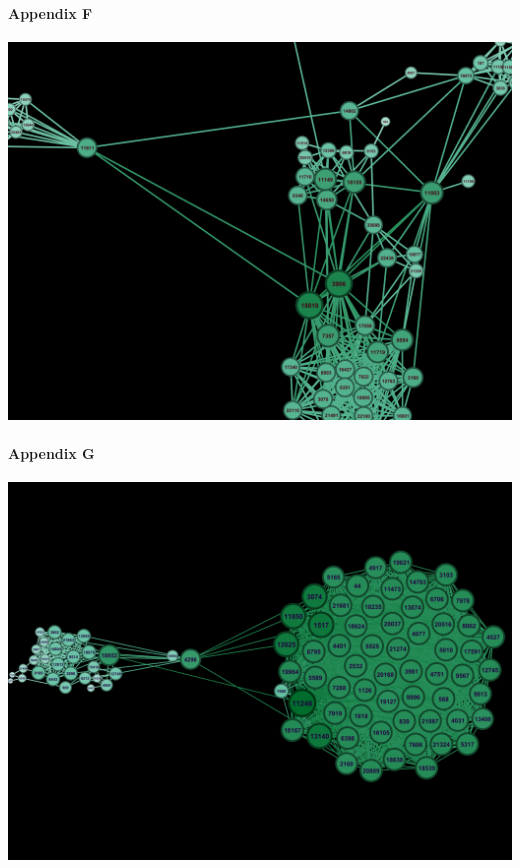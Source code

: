 \documentclass[11pt,twocolumn]{article}
\begin{document}
\paragraph{{\newline}Appendix F\newline\newline\newline\newline\newline}
\includegraphics[scale=0.22]{closennesscentraility_pol.png}
\paragraph{Appendix G\newline\newline\newline\newline\newline}
\includegraphics[scale=0.22]{closennesscentraility_tv.png}
\end{document}
